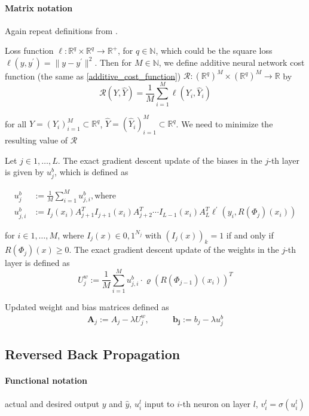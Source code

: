 \documentclass{article}
\def\RealSet{\mathbb{R}}
\begin{document}
\paragraph{Matrix notation}
Again repeat definitions from \cite{Karner:2022}.

Loss function $\ell \colon \RealSet^q \times  \RealSet^q \rightarrow  \RealSet^{+}$, for $q \in \mathbb{N}$, which could be the square loss $\ell(y,y^\prime)=\| y - y^\prime \|^2$. Then for $M \in \mathbb{N}$, we define additive neural network cost function (the same as \eqref{additive_cost_function}) $\mathcal{R} \colon (\RealSet^q)^M \times (\RealSet^q)^M \rightarrow \RealSet$ by
\[
{\mathcal{R}} (Y,\hat Y) = \frac1{M} \sum_{i=1}^M \ell(Y_i, \hat Y_i)
\]

for all $Y=(Y_i)_{i=1}^M \subset \RealSet^q$, $\hat Y = (\hat Y_i)_{i=1}^M \subset \RealSet^q$. We need to minimize the resulting value of ${\mathcal{R}}$

Let $j \in {1,\ldots,L}$. The exact gradient descent update of the biases in the $j$-th layer is given by $u_j^b$, which is defined as

\begin{align}
u_j^b &:= \frac1{M} \sum_{i=1}^M u_{j,i}^b, \text{where} \\
u_{j,i}^b &:= I_j(x_i)A_{j+1}^T I_{j+1}(x_i) A_{j+2}^T \cdots I_{L-1}(x_i)A_L^T \ell^\prime(y_i, R(\Phi_j)(x_i))
\end{align}

for $i\in {1,\ldots,M}$, where $I_j(x)\in{0,1}^{N_j}$ with $(I_j(x))_k = 1$ if and only if $R(\Phi_j)(x)\geqslant 0$.
The exact gradient descent update of the weights in the $j$-th layer is defined as
\[
U_j^w := \frac{1}{M} \sum_{i=1}^{M} u_{j,i}^b \cdot \varrho(R(\Phi_{j-1})(x_i))^T
\]

Updated weight and bias matrices defined as
\begin{align}
\mathbf{A}_j := A_j - \lambda U_j^w, &\qquad \mathbf{b_j} := b_j - \lambda u_j^b
\end{align}


\subsection{Reversed Back Propagation}

\paragraph{Functional notation}

actual and desired output $y$ and $\hat y$, $u_i^l$ input to $i$-th neuron on layer $l$, $v_i^l = \sigma(u_i^l)$
\end{document}
